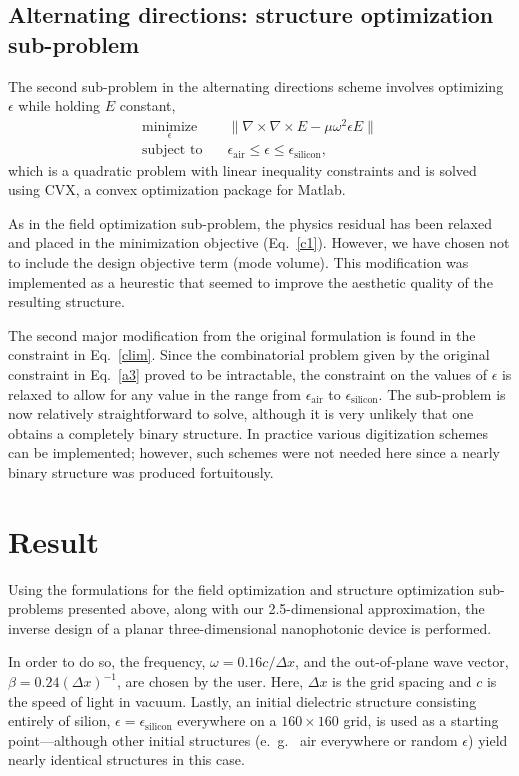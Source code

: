 \subsection{Alternating directions: structure optimization sub-problem}
The second sub-problem in the alternating directions scheme involves optimizing $\epsilon$ while holding $E$ constant,
\begin{align}
\underset{\epsilon}{\text{minimize}} \quad& \|\nabla\times\nabla\times E - \mu\omega^2\epsilon E\| \label{c1} \\
\text{subject to} \quad 
    & \epsilon_\text{air} \le \epsilon \le \epsilon_\text{silicon}, \label{clim}
\end{align}
which is a quadratic problem with linear inequality constraints and is solved using CVX\cite{cvx}, a convex optimization package for Matlab.

As in the field optimization sub-problem, the physics residual has been relaxed and placed in the minimization objective (Eq.~\ref{c1}). However, we have chosen not to include the design objective term (mode volume). This modification was implemented as a heurestic that seemed to improve the aesthetic quality of the resulting structure.

The second major modification from the original formulation is found in the constraint in Eq.~\ref{clim}. Since the combinatorial problem given by the original constraint in Eq.~\ref{a3} proved to be intractable, the constraint on the values of $\epsilon$ is relaxed to allow for any value in the range from $\epsilon_\text{air}$ to $\epsilon_\text{silicon}$. The sub-problem is now relatively straightforward to solve, although it is very unlikely that one obtains a completely binary structure. In practice various digitization schemes can be implemented\cite{digitize}; however, such schemes were not needed here since a nearly binary structure was produced fortuitously.

\section{Result}
Using the formulations for the field optimization and structure optimization sub-problems presented above, along with our 2.5-dimensional approximation, the inverse design of a planar three-dimensional nanophotonic device is performed.

In order to do so, the frequency, $\omega = 0.16 c/\Delta x$, and the out-of-plane wave vector, $\beta = 0.24 (\Delta x)^{-1}$, are chosen by the user. Here, $\Delta x$ is the grid spacing and $c$ is the speed of light in vacuum. Lastly, an initial dielectric structure consisting entirely of silion, $\epsilon = \epsilon_\text{silicon}$ everywhere on a $160 \times 160$ grid, is used as a starting point---although other initial structures (e.~g.~ air everywhere or random $\epsilon$) yield nearly identical structures in this case.

